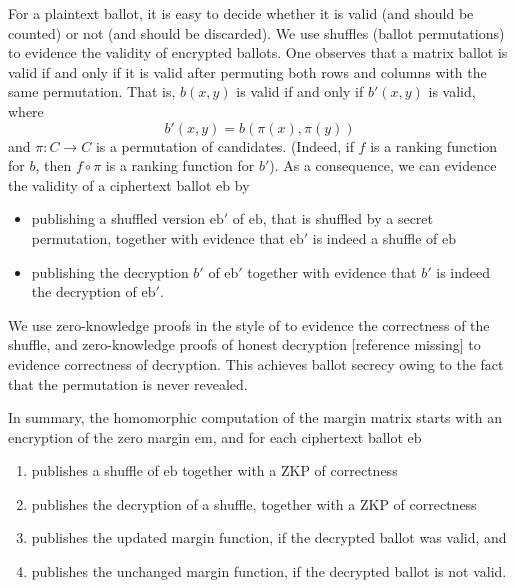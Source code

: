 \documentclass{llncs}
\newcommand{\encb}{\mathrm{eb}}
\newcommand{\encm}{\mathrm{em}}
\begin{document}
For a plaintext ballot, it is easy to decide whether it is
valid (and should be counted) or not (and should be discarded). We
use shuffles (ballot permutations) to evidence the validity of
encrypted ballots. One observes that a matrix ballot is valid if and
only if it is valid after permuting both rows and columns with the
same permutation. That is, $b(x,y)$ is valid if and only if $b'(x,y)$
is valid, where
\[ b'(x,y) = b(\pi(x), \pi(y)) \]
and $\pi: C \to C$ is a permutation of candidates. (Indeed, if $f$
is a ranking function for $b$, then $f \circ \pi$ is a ranking
function for $b'$). As a consequence, we can evidence the validity
of a ciphertext ballot $\encb$ by
\begin{itemize}
  \item publishing a shuffled version $\encb'$ of $\encb$, that is
  shuffled by a secret permutation, together with
  evidence that $\encb'$ is indeed a shuffle of $\encb$
  \item publishing the decryption $b'$ of $\encb'$ together with
  evidence that $b'$ is indeed the decryption of $\encb'$.
\end{itemize}

We use zero-knowledge proofs in the style of \cite{Bayer:2012:EZK}
to evidence the correctness of the shuffle, and zero-knowledge
proofs of honest decryption [reference missing] to evidence
correctness of decryption. This achieves ballot secrecy owing to the
fact that the permutation is never revealed.


In summary, the homomorphic computation of the margin matrix starts
with an encryption of the zero margin $\encm$, and for each
ciphertext ballot $\encb$
\begin{enumerate}
\item publishes a shuffle of $\encb$ together with a ZKP of 
correctness
\item publishes the decryption of a shuffle, together with a ZKP of
correctness
\item publishes the updated margin function, if the decrypted ballot
was valid, and
\item publishes the unchanged margin function, if the decrypted
ballot is not valid.
\end{enumerate}
\end{document}

